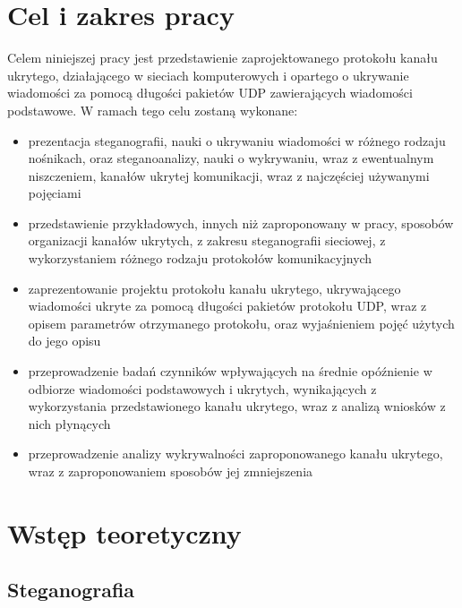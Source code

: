 \documentclass[a4paper, twoside, 12pt]{report}
\begin{document}
\tableofcontents

\listoffigures

\chapter{Cel i zakres pracy}
    Celem niniejszej pracy jest przedstawienie zaprojektowanego protokołu kanału
    ukrytego, działającego w sieciach komputerowych i  opartego o ukrywanie wiadomości za pomocą długości pakietów UDP
    zawierających wiadomości podstawowe. W ramach tego celu zostaną wykonane:
    \begin{itemize}
        \item prezentacja steganografii, nauki o ukrywaniu wiadomości w różnego rodzaju nośnikach,
            oraz steganoanalizy, nauki o wykrywaniu, wraz z ewentualnym niszczeniem, kanałów
            ukrytej komunikacji, wraz z najczęściej używanymi pojęciami
        \item przedstawienie przykładowych, innych niż zaproponowany w pracy,
            sposobów organizacji kanałów ukrytych, z zakresu steganografii sieciowej,
            z wykorzystaniem różnego rodzaju protokołów komunikacyjnych
        \item zaprezentowanie projektu protokołu kanału ukrytego, ukrywającego
            wiadomości ukryte za pomocą długości pakietów protokołu UDP, wraz
            z opisem parametrów otrzymanego protokołu, oraz wyjaśnieniem pojęć
            użytych do jego opisu
        \item przeprowadzenie badań czynników wpływających na średnie opóźnienie
            w odbiorze wiadomości podstawowych i ukrytych, wynikających z wykorzystania
            przedstawionego kanału ukrytego, wraz z analizą wniosków
            z nich płynących
        \item przeprowadzenie analizy wykrywalności zaproponowanego kanału ukrytego,
            wraz z zaproponowaniem sposobów jej zmniejszenia
    \end{itemize}

\chapter{Wstęp teoretyczny}
    \section{Steganografia}
\end{document}
